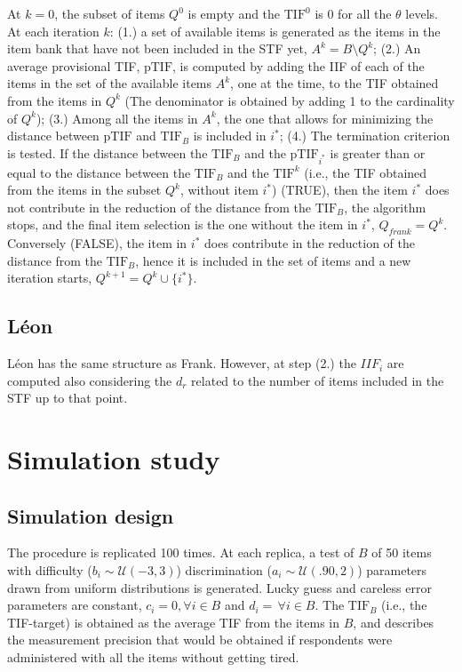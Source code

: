 \documentclass{svproc}
\begin{document}
At $k = 0$, the subset of items $Q^0$ is empty and the $\text{TIF}^0$ is 0 for all the $\theta$ levels. 
At each iteration $k$: (1.) a set of available items is generated as the items in the item bank that have not been included in the STF yet, $A^k = B \setminus Q^k$; (2.)
An average provisional TIF, $\text{pTIF}$, is computed by adding the IIF of each of the items in the set of the available items $A^k$, one at the time, to the TIF obtained from the items in $Q^k$ (The denominator is obtained by adding 1 to the cardinality of $Q^k$); (3.) Among all the items in $A^k$, the one that allows for minimizing the distance between $\text{pTIF}$ and $\text{TIF}_B$ is included in $i^*$; (4.) 
The termination criterion is tested. 
If the distance between the $\text{TIF}_B$ and the $\text{pTIF}_{i^*}$ is greater than or equal to the distance between the $\text{TIF}_B$ and the $\text{TIF}^k$ (i.e., the TIF obtained from the items in the subset $Q^k$, without item $i^*$) (TRUE), then the item $i^*$ does not contribute in the reduction of the distance from the $\text{TIF}_B$, the algorithm stops, and the final item selection is the one without the item in $i^*$, $Q_{frank} = Q^k$. Conversely (FALSE), the item in $i^*$ does contribute in the reduction of the distance from the $\text{TIF}_B$, hence it is included in the set of items and a new iteration starts, $Q^{k+1} = Q^k \cup \{i^*\}$.

\color{blue}
\subsection{Léon}
Léon has the same structure as Frank. However, at step (2.) the $IIF_i$ are computed also considering the $d_r$ related to the number of items included in the STF up to that point.  
\normalcolor


\section{Simulation study}

\subsection{Simulation design}



The procedure is replicated 100 times. At each replica, a test of $B$ of 50 items with difficulty ($b_i \sim \mathcal{U}(-3, 3)$) discrimination ($a_i \sim \mathcal{U}(.90, 2)$) parameters drawn from uniform distributions is generated. Lucky 
guess and careless error parameters are constant, $c_i = 0, \forall i \in B$ and $d_i = \, \forall i \in B$.
The $\text{TIF}_B$ (i.e., the TIF-target) is obtained as the average TIF  from the items in $B$, and describes the measurement precision that would be obtained if respondents were administered with all the items without getting tired. 
\end{document}
